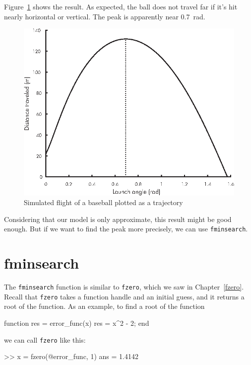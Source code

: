 Figure~\ref{fig:baseball4} shows the result.  As expected, the ball does not travel far if it's hit nearly horizontal or vertical. 
The peak is apparently near \SI{0.7}{\radian}.

\begin{figure}[h]
\includegraphics{images/figure13_02_new.eps}
\caption{Simulated flight of a baseball plotted as a trajectory}
\label{fig:baseball4}
\end{figure}


Considering that our model is only approximate, this result might be good enough.  But if we want to find the peak more precisely, we can use \lstinline{fminsearch}.


\section{fminsearch}

The \lstinline{fminsearch} function is similar to \lstinline{fzero}, which we saw in Chapter~\ref{fzero}.  Recall that \lstinline{fzero} takes a function handle and an initial guess, and it returns a root of the function.
As an example, to find a root of the function


\begin{code}
function res = error_func(x)
    res = x^2 - 2;
end
\end{code}
we can call \lstinline{fzero} like this:

\begin{code}
>> x = fzero(@error_func, 1)
ans = 1.4142
\end{code}

